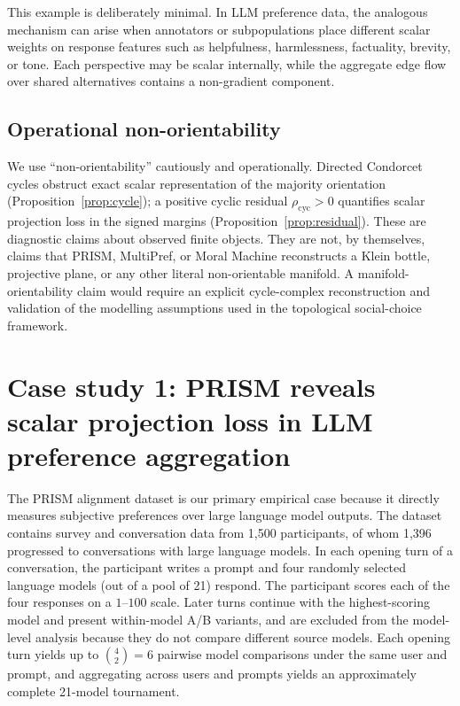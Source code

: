 \documentclass[10pt]{article}
\theoremstyle{definition}
\theoremstyle{remark}
\begin{document}
This example is deliberately minimal. In LLM preference data, the analogous mechanism can arise when annotators or subpopulations place different scalar weights on response features such as helpfulness, harmlessness, factuality, brevity, or tone. Each perspective may be scalar internally, while the aggregate edge flow over shared alternatives contains a non-gradient component.

\subsection{Operational non-orientability}

We use ``non-orientability'' cautiously and operationally. Directed Condorcet cycles obstruct exact scalar representation of the majority orientation (Proposition~\ref{prop:cycle}); a positive cyclic residual $\rho_{\mathrm{cyc}}>0$ quantifies scalar projection loss in the signed margins (Proposition~\ref{prop:residual}). These are diagnostic claims about observed finite objects. They are not, by themselves, claims that PRISM, MultiPref, or Moral Machine reconstructs a Klein bottle, projective plane, or any other literal non-orientable manifold. A manifold-orientability claim would require an explicit cycle-complex reconstruction and validation of the modelling assumptions used in the topological social-choice framework.

\section{Case study 1: PRISM reveals scalar projection loss in LLM preference aggregation}
\label{sec:prism}

The PRISM alignment dataset\cite{kirk2024} is our primary empirical case because it directly measures subjective preferences over large language model outputs. The dataset contains survey and conversation data from 1,500 participants, of whom 1,396 progressed to conversations with large language models. In each opening turn of a conversation, the participant writes a prompt and four randomly selected language models (out of a pool of 21) respond. The participant scores each of the four responses on a $1$--$100$ scale. Later turns continue with the highest-scoring model and present within-model A/B variants, and are excluded from the model-level analysis because they do not compare different source models. Each opening turn yields up to $\binom{4}{2}=6$ pairwise model comparisons under the same user and prompt, and aggregating across users and prompts yields an approximately complete 21-model tournament.
\end{document}
